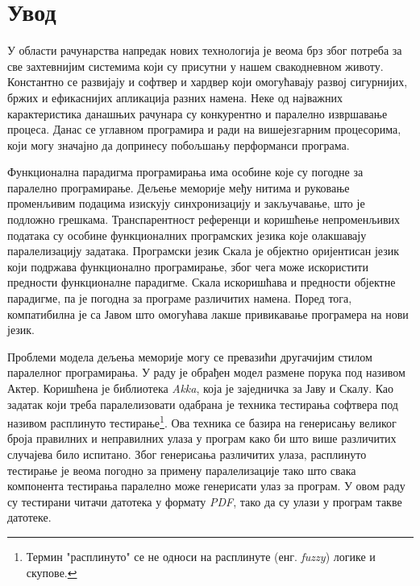 \documentclass[12pt,oneside]{memoir}
\begin{document}
\frontmatter
\naslovna
\komisija
\tableofcontents*

\mainmatter

\chapter{Увод}

У области рачунарства напредак нових технологија је веома брз због потреба за све захтевнијим системима који су присутни у нашем свакодневном животу. Константно се развијају и софтвер и хардвер који омогућавају развој сигурнијих, бржих и ефикаснијих апликација разних намена. Неке од најважних карактеристика данашњих рачунара су конкурентно и паралелно извршавање процеса. Данас се углавном програмира и ради на вишејезгарним процесорима, који могу значајно да допринесу побољшању перформанси програма. 

Функционална парадигма програмирања има особине које су погодне за паралелно програмирање. Дељење меморије међу нитима и руковање променљивим подацима изискују синхронизацију и закључавање, што је подложно грешкама. Транспарентност референци и коришћење непроменљивих података су особине функционалних програмских језика које олакшавају паралелизацију задатака. Програмски језик Скала је објектно оријентисан језик који подржава функционално програмирање, због чега може искористити предности функционалне парадигме. Скала искоришћава и предности објектне парадигме, па је погодна за програме различитих намена. Поред тога, компатибилна је са Јавом што омогућава лакше привикавање програмера на нови језик.

Проблеми модела дељења меморије могу се превазићи другачијим стилом паралелног програмирања. У раду је обрађен модел размене порука под називом Актер. Коришћена је библиотека \textit{Akka}, која је заједничка за Јаву и Скалу. Као задатак који треба паралелизовати одабрана је техника тестирања софтвера под називом расплинуто тестирање\footnote{Термин "расплинуто" се не односи на расплинуте (енг. \textit{fuzzy}) логике и скупове.}. Ова техника се базира на генерисању великог броја правилних и неправилних улаза у програм како би што више различитих случајева било испитано. Због генерисања различитих улаза, расплинуто тестирање је веома погодно за примену паралелизације тако што свака компонента тестирања паралелно може генерисати улаз за програм. У овом раду су тестирани читачи датотека у формату \textit{PDF}, тако да су улази у програм такве датотеке.
\end{document}
